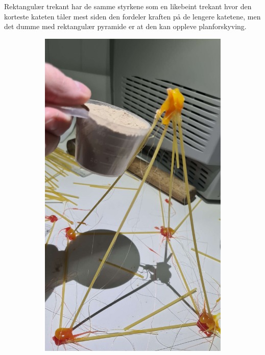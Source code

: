 \documentclass{report}
\newcommand{\subimgw}{.7\linewidth}
\begin{document}
Rektangulær trekant har de samme styrkene som en likebeint trekant hvor den korteste kateten tåler mest siden den fordeler kraften på de lengere katetene, men det dumme med rektangulær pyramide er at den kan oppleve planforskyving.

\begin{figure}[H]
	\begin{subfigure}{.5\textwidth}
		\centering
		\includegraphics[width=\subimgw]{pyramid-a}


\end{subfigure}
\end{figure}
\end{document}
